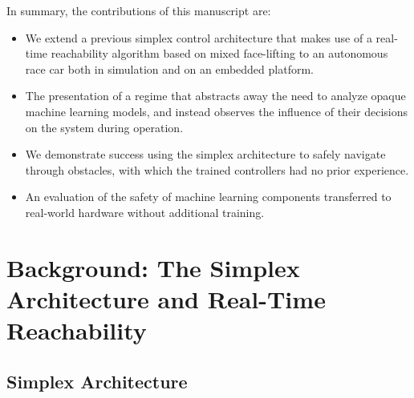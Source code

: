 \documentclass[manuscript,screen,review]{acmart}
\begin{document}
In summary, the contributions of this manuscript are: \raggedbottom
\begin{itemize}%
    \item We extend a previous simplex control architecture that makes use of a real-time reachability algorithm based on mixed face-lifting to an autonomous race car both in simulation and on an embedded platform.
    \item The presentation of a regime that abstracts away the need to analyze opaque machine learning models, and instead observes the influence of their decisions on the system during operation.
    \item We demonstrate success using the simplex architecture to safely navigate through obstacles, with which the trained controllers had no prior experience.
    \item An evaluation of the safety of machine learning components transferred to real-world hardware without additional training.
\end{itemize}%
\vspace{-1.5mm}
\section{Background: The Simplex Architecture and Real-Time Reachability}
\subsection{Simplex Architecture}

\end{document}
